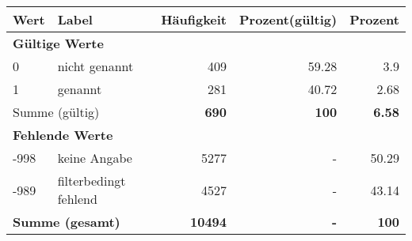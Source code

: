      \begin{longtable}{lXrrr}
     \toprule
     \textbf{Wert} & \textbf{Label} & \textbf{Häufigkeit} & \textbf{Prozent(gültig)} & \textbf{Prozent} \\
     \endhead
     \midrule
     \multicolumn{5}{l}{\textbf{Gültige Werte}}\\

     0 &
     \multicolumn{1}{X}{ nicht genannt   } &


       \num{409} &
       \num[round-mode=places,round-precision=2]{59.28} &
         \num[round-mode=places,round-precision=2]{3.9} \\

     1 &
     \multicolumn{1}{X}{ genannt   } &


       \num{281} &
       \num[round-mode=places,round-precision=2]{40.72} &
         \num[round-mode=places,round-precision=2]{2.68} \\
     \midrule
     \multicolumn{2}{l}{Summe (gültig)} &
       \textbf{\num{690}} &
     \textbf{\num{100}} &
       \textbf{\num[round-mode=places,round-precision=2]{6.58}} \\
     \multicolumn{5}{l}{\textbf{Fehlende Werte}}\\
       -998 &
       keine Angabe &
         \num{5277} &
        - &
         \num[round-mode=places,round-precision=2]{50.29} \\
       -989 &
       filterbedingt fehlend &
         \num{4527} &
        - &
         \num[round-mode=places,round-precision=2]{43.14} \\
     \midrule
     \multicolumn{2}{l}{\textbf{Summe (gesamt)}} &
          \textbf{\num{10494}} &
        \textbf{-} &
        \textbf{\num{100}} \\
     \bottomrule
     \end{longtable}
     
